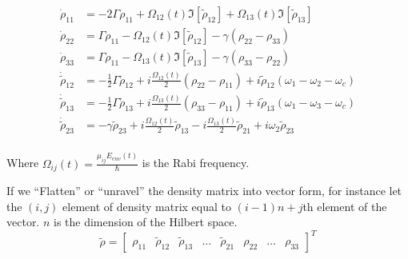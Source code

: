 \documentclass[11pt,a4paper]{article}
\begin{document}
\begin{align}
  \label{eq:timeevo3}
  \dot{\rho}_{11} &= -2\Gamma \rho_{11} + \Omega_{12}(t)\Im \left[ \tilde{\rho}_{12} \right]+\Omega_{13}(t)\Im \left[ \tilde{\rho}_{13} \right]\nonumber\\
  \dot{\rho}_{22} &= \Gamma \rho_{11} -\Omega_{12}(t)\Im \left[ \tilde{\rho}_{12} \right] - \gamma \left( \rho_{22} - \rho_{33} \right)\nonumber\\
  \dot{\rho}_{33} &= \Gamma \rho_{11} -\Omega_{13}(t)\Im \left[ \tilde{\rho}_{13} \right] - \gamma \left( \rho_{33} - \rho_{22} \right)\nonumber\\
  \dot{\tilde{\rho}}_{12} &= -\frac{1}{2}\Gamma\tilde{\rho}_{12} +i \frac{\Omega_{12}(t)}{2}\left( \rho_{22} - \rho_{11} \right) + i \tilde{\rho}_{12} \left( \omega_1 - \omega_2 -\omega_c \right) \nonumber\\
  \dot{\tilde{\rho}}_{13} &= -\frac{1}{2}\Gamma\tilde{\rho}_{13} +i \frac{\Omega_{13}(t)}{2} \left( \rho_{33} - \rho_{11} \right) + i \tilde{\rho}_{13} \left( \omega_1 - \omega_3 -\omega_c \right)\nonumber\\
  \dot{\tilde{\rho}}_{23} &= -\gamma\tilde{\rho}_{23} + i \frac{\Omega_{12}(t)}{2}\tilde{\rho}_{13} -i \frac{\Omega_{13}(t)}{2}\tilde{\rho}_{21}+i\omega_2 \tilde{\rho}_{23}\nonumber\\
\end{align}

Where $\Omega_{ij}(t) = \frac{\mu_{ij}E_{env}(t)}{\hbar}$ is the Rabi frequency.

If we ``Flatten'' or ``unravel'' the density matrix into vector form, for instance let the $(i,j)$ element of density matrix equal to $(i-1)n+j$th element of the vector. $n$ is the dimension of the Hilbert space.
\begin{equation}
  \tilde{\rho} =
   \begin{bmatrix}
   \rho_{11}&
   \tilde{\rho}_{12}&
  \tilde{\rho}_{13}&
  \hdots&
  \tilde{\rho}_{21}&
  \rho_{22}&
  \hdots&
  \rho_{33}
\end{bmatrix}^{T}
\end{equation}
\end{document}

